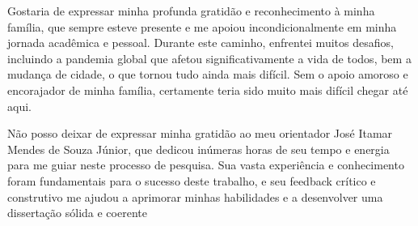 \begin{agradecimentos}

    Gostaria de expressar minha profunda gratidão e reconhecimento à minha família,
que sempre esteve presente e me apoiou incondicionalmente em minha jornada acadêmica
e pessoal. Durante este caminho, enfrentei muitos desafios, incluindo a pandemia global
que afetou significativamente a vida de todos, bem a mudança de cidade, o que tornou tudo ainda mais difícil. Sem o apoio amoroso e
encorajador de minha família, certamente teria sido muito mais difícil chegar até aqui.

    Não posso deixar de expressar minha gratidão ao meu orientador José Itamar Mendes de Souza Júnior, que dedicou inúmeras horas de seu tempo e energia para me guiar neste processo de pesquisa. Sua vasta experiência e conhecimento foram fundamentais para o sucesso deste trabalho, e seu feedback crítico e construtivo me ajudou a aprimorar minhas habilidades e a desenvolver uma dissertação sólida e coerente
	


\end{agradecimentos}